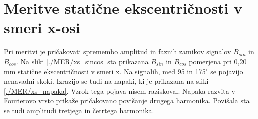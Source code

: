 \section{Meritve statične ekscentričnosti v smeri x-osi}
Pri meritvi je pričakovati spremembo amplitud in faznih zamikov signalov $B_{sin}$ in $B_{cos}$. Na sliki \ref{./MER/xs_sincos} sta prikazana $B_{sin}$ in $B_{cos}$ pomerjena pri 0,20 mm statične ekscentričnosti v smeri x. Na signalih, med 95 in 175$^\circ$ se pojavijo nenavadni skoki.
Izrazijo se tudi na napaki, ki je prikazana na sliki \ref{./MER/xs_napaka}. Vzrok tega pojava nisem raziskoval. Napaka razvita v Fourierovo vrsto prikaže pričakovano povišanje drugega harmonika. Povišala sta se tudi amplitudi tretjega in četrtega harmonika.
\newpage
